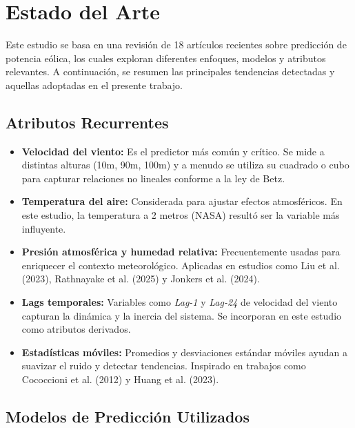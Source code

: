 \documentclass[conference]{IEEEtran}
\begin{document}
\section{Estado del Arte}

Este estudio se basa en una revisión de 18 artículos recientes sobre predicción de potencia eólica, los cuales exploran diferentes enfoques, modelos y atributos relevantes. A continuación, se resumen las principales tendencias detectadas y aquellas adoptadas en el presente trabajo.

\subsection{Atributos Recurrentes}

\begin{itemize}
	\item \textbf{Velocidad del viento:} Es el predictor más común y crítico. Se mide a distintas alturas (10m, 90m, 100m) y a menudo se utiliza su cuadrado o cubo para capturar relaciones no lineales conforme a la ley de Betz.
	
	\item \textbf{Temperatura del aire:} Considerada para ajustar efectos atmosféricos. En este estudio, la temperatura a 2 metros (NASA) resultó ser la variable más influyente.
	
	\item \textbf{Presión atmosférica y humedad relativa:} Frecuentemente usadas para enriquecer el contexto meteorológico. Aplicadas en estudios como Liu et al. (2023), Rathnayake et al. (2025) y Jonkers et al. (2024).
	
	\item \textbf{Lags temporales:} Variables como \textit{Lag-1} y \textit{Lag-24} de velocidad del viento capturan la dinámica y la inercia del sistema. Se incorporan en este estudio como atributos derivados.
	
	\item \textbf{Estadísticas móviles:} Promedios y desviaciones estándar móviles ayudan a suavizar el ruido y detectar tendencias. Inspirado en trabajos como Cococcioni et al. (2012) y Huang et al. (2023).
\end{itemize}

\subsection{Modelos de Predicción Utilizados}
\end{document}
